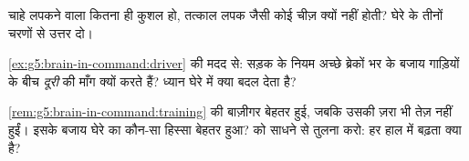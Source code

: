 \begin{exercise}[$\star\star$]\label{exo:g5:brain-in-command:9}
चाहे लपकने वाला कितना ही कुशल हो, तत्काल लपक जैसी कोई चीज़ क्यों नहीं
होती? घेरे के तीनों चरणों से उत्तर दो।
\end{exercise}

\begin{exercise}[$\star\star$]\label{exo:g5:brain-in-command:10}
\cref{ex:g5:brain-in-command:driver} की मदद से: सड़क के नियम अच्छे
ब्रेकों भर के बजाय गाड़ियों के बीच \emph{दूरी} की माँग क्यों करते हैं?
ध्यान घेरे में क्या बदल देता है?
\end{exercise}

\begin{exercise}[$\star\star\star$]\label{exo:g5:brain-in-command:11}
\cref{rem:g5:brain-in-command:training} की बाज़ीगर बेहतर हुई, जबकि
उसकी  ज़रा भी तेज़ नहीं हुईं। इसके बजाय घेरे का कौन-सा हिस्सा
बेहतर हुआ?  को साधने से तुलना करो: हर हाल में बढ़ता क्या है?
\end{exercise}

